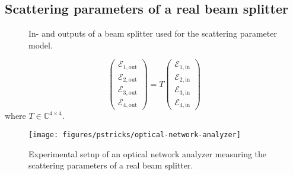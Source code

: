 \subsection{Scattering parameters of a real beam splitter}


\begin{figure}[htb]
    \centering
    
    \caption{In- and outputs of a beam splitter used for the scattering parameter model.}\label{fig:beam_splitter_scattering_parameters}
\end{figure}

\begin{equation}
    \begin{pmatrix}
        \mathcal{E}_{1,\text{out}} \\
        \mathcal{E}_{2,\text{out}} \\
        \mathcal{E}_{3,\text{out}} \\
        \mathcal{E}_{4,\text{out}}
    \end{pmatrix}
    =
    T
    \begin{pmatrix}
        \mathcal{E}_{1,\text{in}} \\
        \mathcal{E}_{2,\text{in}} \\
        \mathcal{E}_{3,\text{in}} \\
        \mathcal{E}_{4,\text{in}}
    \end{pmatrix}
\end{equation}
where $T\in\mathbb{C}^{4\times4}$.

\begin{figure}[htb]
    \centering
    \texttt{[image: figures/pstricks/optical-network-analyzer]}
    \caption{Experimental setup of an optical network analyzer measuring the scattering parameters of a real beam splitter.}\label{fig:beam_splitter_network_analyzer}
\end{figure}
